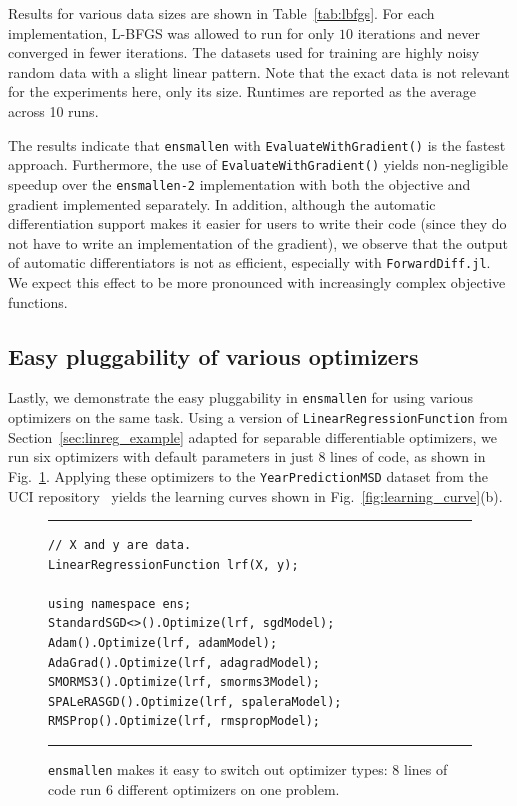 Results for various data sizes are shown in Table~\ref{tab:lbfgs}.  For each
implementation, L-BFGS was allowed to run for only $10$ iterations and never
converged in fewer iterations.  The datasets used for training are highly noisy random
data with a slight linear pattern. Note that the exact data is not relevant
for the experiments here, only its size.  Runtimes are reported as the
average across 10 runs.

The results indicate that \texttt{ensmallen} with
\texttt{EvaluateWithGradient()} is the fastest approach.
Furthermore, the use of \texttt{EvaluateWithGradient()} yields
non-negligible speedup over the \texttt{ensmallen-2} implementation with
both the objective and gradient implemented separately.  In addition, although
the automatic differentiation support makes it easier for users to write their
code (since they do not have to write an implementation of the gradient), we
observe that the output of automatic differentiators is not as efficient,
especially with \texttt{ForwardDiff.jl}.  We expect this effect to be
more pronounced with increasingly complex objective functions.

\subsection{Easy pluggability of various optimizers}

Lastly, we demonstrate the easy pluggability in \texttt{ensmallen}
for using various optimizers on the same task.
Using a version of {\tt LinearRegressionFunction} from
Section~\ref{sec:linreg_example} adapted for separable differentiable
optimizers, we run six optimizers with default parameters in just 8 lines of
code, as shown in Fig.~\ref{fig:learning_curve_code}.
Applying these optimizers to the \texttt{YearPredictionMSD}
dataset from the UCI repository~\cite{ucimlrepository}
yields the learning curves shown in Fig.~\ref{fig:learning_curve}(b).

\begin{figure}[t!]
\hrule
\vspace{1ex}
\begin{verbatim}
// X and y are data.
LinearRegressionFunction lrf(X, y);

using namespace ens;
StandardSGD<>().Optimize(lrf, sgdModel);
Adam().Optimize(lrf, adamModel);
AdaGrad().Optimize(lrf, adagradModel);
SMORMS3().Optimize(lrf, smorms3Model);
SPALeRASGD().Optimize(lrf, spaleraModel);
RMSProp().Optimize(lrf, rmspropModel);
\end{verbatim}
\hrule
\vspace*{-0.5em}
\caption{{\tt ensmallen} makes it easy to switch out optimizer types: 8
lines of code run 6 different optimizers on one problem.}
\label{fig:learning_curve_code}
\end{figure}

